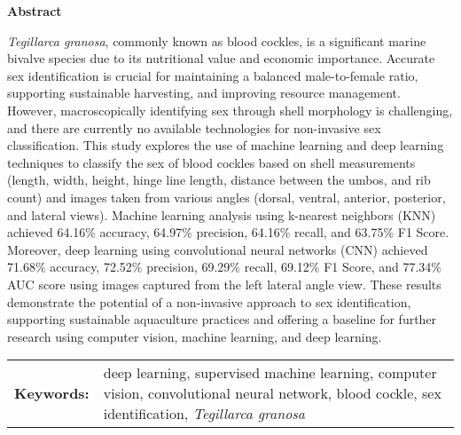 \begin{center}
	\textbf{Abstract}
\end{center}
\setlength{\parindent}{0pt}
\textit{Tegillarca granosa}, commonly known as blood cockles, is a significant marine bivalve species due to its nutritional value and economic importance. Accurate sex identification is crucial for maintaining a balanced male-to-female ratio, supporting sustainable harvesting, and improving resource management. However, macroscopically identifying sex through shell morphology is challenging, and there are currently no available technologies for non-invasive sex classification. This study explores the use of machine learning and deep learning techniques to classify the sex of blood cockles based on shell measurements (length, width, height, hinge line length, distance between the umbos, and rib count) and images taken from various angles (dorsal, ventral, anterior, posterior, and lateral views). Machine learning analysis using k-nearest neighbors (KNN) achieved 64.16\% accuracy, 64.97\% precision, 64.16\% recall, and 63.75\% F1 Score. Moreover, deep learning using convolutional neural networks (CNN) achieved 71.68\% accuracy, 72.52\% precision, 69.29\% recall, 69.12\% F1 Score, and 77.34\% AUC score using images captured from the left lateral angle view. These results demonstrate the potential of a non-invasive approach to sex identification, supporting sustainable aquaculture practices and offering a baseline for further research using computer vision, machine learning, and deep learning.

\begin{tabular}{lp{4.25in}}
	\hspace{-0.5em}\textbf{Keywords:}\hspace{0.25em} & deep learning, supervised machine learning, computer vision, convolutional neural network, blood cockle, sex identification, \textit{Tegillarca granosa}\\
\end{tabular}
